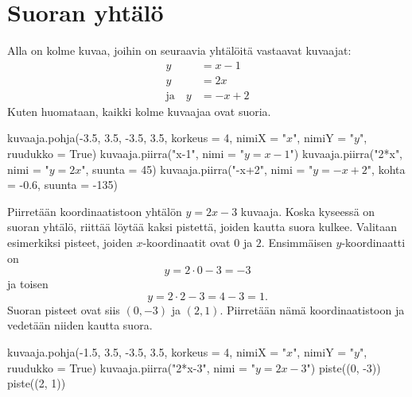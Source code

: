 \section{Suoran yhtälö}


Alla on kolme kuvaa, joihin on seuraavia yhtälöitä vastaavat kuvaajat:
\begin{align*}
y & =x-1 \\
y & =2x \\
\text{ja} \quad y & =-x+2
\end{align*}
Kuten huomataan, kaikki kolme kuvaajaa ovat suoria.

\begin{kuva}
    kuvaaja.pohja(-3.5, 3.5, -3.5, 3.5, korkeus = 4, nimiX = "$x$", nimiY = "$y$", ruudukko = True)
    kuvaaja.piirra("x-1", nimi = "$y=x-1$")
    kuvaaja.piirra("2*x", nimi = "$y=2x$", suunta = 45)
    kuvaaja.piirra("-x+2", nimi = "$y=-x+2$", kohta = -0.6, suunta = -135)
\end{kuva}




\begin{esimerkki} Piirretään koordinaatistoon yhtälön $y=2x-3$ kuvaaja. Koska kyseessä on suoran yhtälö, riittää löytää kaksi pistettä, joiden kautta suora kulkee.
Valitaan esimerkiksi pisteet, joiden $x$-koordinaatit ovat $0$ ja $2$. Ensimmäisen $y$-koordinaatti on
\[
y=2\cdot 0-3=-3
\]
ja toisen
\[
y=2\cdot 2-3=4-3=1.
\]
Suoran pisteet ovat siis $(0, -3)$ ja $(2, 1)$. Piirretään nämä koordinaatistoon ja vedetään niiden kautta suora.

\begin{kuva}
    kuvaaja.pohja(-1.5, 3.5, -3.5, 3.5, korkeus = 4, nimiX = "$x$", nimiY = "$y$", ruudukko = True)
    kuvaaja.piirra("2*x-3", nimi = "$y=2x-3$")
    piste((0, -3))
    piste((2, 1))
\end{kuva}

\end{esimerkki}

